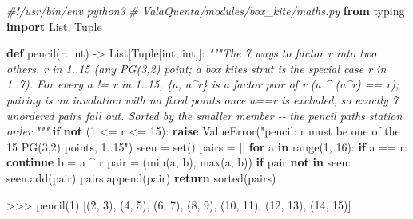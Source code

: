 \documentclass[
  10pt,
]{article}
\newenvironment{Shaded}{}{}
\newcommand{\BuiltInTok}[1]{\textcolor[rgb]{0.00,0.50,0.00}{#1}}
\newcommand{\CommentTok}[1]{\textcolor[rgb]{0.38,0.63,0.69}{\textit{#1}}}
\newcommand{\ControlFlowTok}[1]{\textcolor[rgb]{0.00,0.44,0.13}{\textbf{#1}}}
\newcommand{\DecValTok}[1]{\textcolor[rgb]{0.25,0.63,0.44}{#1}}
\newcommand{\ImportTok}[1]{\textcolor[rgb]{0.00,0.50,0.00}{\textbf{#1}}}
\newcommand{\KeywordTok}[1]{\textcolor[rgb]{0.00,0.44,0.13}{\textbf{#1}}}
\newcommand{\NormalTok}[1]{#1}
\newcommand{\OperatorTok}[1]{\textcolor[rgb]{0.40,0.40,0.40}{#1}}
\newcommand{\PreprocessorTok}[1]{\textcolor[rgb]{0.74,0.48,0.00}{#1}}
\newcommand{\StringTok}[1]{\textcolor[rgb]{0.25,0.44,0.63}{#1}}
\begin{document}
\begin{Shaded}
\begin{Highlighting}[]
\CommentTok{\#!/usr/bin/env python3}
\CommentTok{\# ValaQuenta/modules/box\_kite/maths.py}
\ImportTok{from}\NormalTok{ typing }\ImportTok{import}\NormalTok{ List, Tuple}

\KeywordTok{def}\NormalTok{ pencil(r: }\BuiltInTok{int}\NormalTok{) }\OperatorTok{{-}\textgreater{}}\NormalTok{ List[Tuple[}\BuiltInTok{int}\NormalTok{, }\BuiltInTok{int}\NormalTok{]]:}
    \CommentTok{"""The 7 ways to factor r into two others. r in 1..15 (any PG(3,2)}
\CommentTok{    point; a box kite\textquotesingle{}s strut is the special case r in 1..7). For every}
\CommentTok{    a != r in 1..15, \{a, a\^{}r\} is a factor pair of r (a \^{} (a\^{}r) == r);}
\CommentTok{    pairing is an involution with no fixed points once a==r is excluded,}
\CommentTok{    so exactly 7 unordered pairs fall out. Sorted by the smaller member {-}{-}}
\CommentTok{    the pencil path\textquotesingle{}s station order."""}
    \ControlFlowTok{if} \KeywordTok{not}\NormalTok{ (}\DecValTok{1} \OperatorTok{\textless{}=}\NormalTok{ r }\OperatorTok{\textless{}=} \DecValTok{15}\NormalTok{):}
        \ControlFlowTok{raise} \PreprocessorTok{ValueError}\NormalTok{(}\StringTok{"pencil: r must be one of the 15 PG(3,2) points, 1..15"}\NormalTok{)}
\NormalTok{    seen }\OperatorTok{=} \BuiltInTok{set}\NormalTok{()}
\NormalTok{    pairs }\OperatorTok{=}\NormalTok{ []}
    \ControlFlowTok{for}\NormalTok{ a }\KeywordTok{in} \BuiltInTok{range}\NormalTok{(}\DecValTok{1}\NormalTok{, }\DecValTok{16}\NormalTok{):}
        \ControlFlowTok{if}\NormalTok{ a }\OperatorTok{==}\NormalTok{ r:}
            \ControlFlowTok{continue}
\NormalTok{        b }\OperatorTok{=}\NormalTok{ a }\OperatorTok{\^{}}\NormalTok{ r}
\NormalTok{        pair }\OperatorTok{=}\NormalTok{ (}\BuiltInTok{min}\NormalTok{(a, b), }\BuiltInTok{max}\NormalTok{(a, b))}
        \ControlFlowTok{if}\NormalTok{ pair }\KeywordTok{not} \KeywordTok{in}\NormalTok{ seen:}
\NormalTok{            seen.add(pair)}
\NormalTok{            pairs.append(pair)}
    \ControlFlowTok{return} \BuiltInTok{sorted}\NormalTok{(pairs)}
\end{Highlighting}
\end{Shaded}

\begin{Shaded}
\begin{Highlighting}[]
\OperatorTok{\textgreater{}\textgreater{}\textgreater{}}\NormalTok{ pencil(}\DecValTok{1}\NormalTok{)}
\NormalTok{[(}\DecValTok{2}\NormalTok{, }\DecValTok{3}\NormalTok{), (}\DecValTok{4}\NormalTok{, }\DecValTok{5}\NormalTok{), (}\DecValTok{6}\NormalTok{, }\DecValTok{7}\NormalTok{), (}\DecValTok{8}\NormalTok{, }\DecValTok{9}\NormalTok{), (}\DecValTok{10}\NormalTok{, }\DecValTok{11}\NormalTok{), (}\DecValTok{12}\NormalTok{, }\DecValTok{13}\NormalTok{), (}\DecValTok{14}\NormalTok{, }\DecValTok{15}\NormalTok{)]}
\end{Highlighting}
\end{Shaded}
\end{document}
